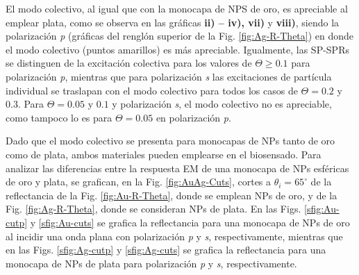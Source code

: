 El modo colectivo, al igual que con la monocapa de NPS de oro, es apreciable al emplear plata, como se observa en las gráficas \textbf{ii) -- iv), vii)} y \textbf{viii)}, siendo la polarización \emph{p} (gráficas del renglón superior de la Fig. \ref{fig:Ag-R-Theta}) en donde el modo colectivo (puntos amarillos) es más apreciable. Igualmente, las SP-SPRs se distinguen de la excitación colectiva para los valores de $\Theta\geq 0.1$  para polarización \emph{p}, mientras que para polarización \emph{s} las excitaciones de partícula individual se traslapan con el modo colectivo para todos los casos de $\Theta=0.2$ y $0.3$. Para $\Theta = 0.05$ y $0.1$ y polarización \emph{s}, el modo colectivo no es apreciable, como tampoco lo es para $\Theta=0.05$ en polarización \emph{p}.

Dado que el modo colectivo se presenta para monocapas de NPs tanto de oro como de plata, ambos materiales pueden emplearse en el biosensado. Para analizar las diferencias entre la respuesta EM de una monocapa de NPs esféricas de oro y plata, se grafican, en la Fig. \ref{fig:AuAg-Cuts}, cortes a $\theta_i = 65^\circ$ de la reflectancia de la Fig. \ref{fig:Au-R-Theta}, donde se emplean NPs de oro, y de la Fig. \ref{fig:Ag-R-Theta}, donde se consideran NPs de plata. En las Figs. \ref{sfig:Au-cutp} y \ref{sfig:Au-cuts} se grafica la reflectancia para una monocapa de NPs de oro al incidir una onda plana con polarización \emph{p} y \emph{s}, respectivamente, mientras que en las Figs. \ref{sfig:Ag-cutp} y \ref{sfig:Ag-cuts} se grafica la reflectancia para una monocapa de NPs de plata para polarización \emph{p} y \emph{s}, respectivamente.

